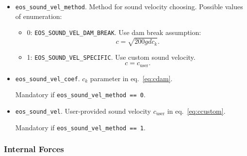 \begin{itemize}
    \item \verb|eos_sound_vel_method|. Method for sound velocity choosing. Possible values of enumeration:

    \begin{itemize}
        \item 0: \verb|EOS_SOUND_VEL_DAM_BREAK|. Use dam break assumption:
        \begin{equation}\label{eq:cdam}
            c = \sqrt{200gdc_{k}}.
        \end{equation}

        \item 1: \verb|EOS_SOUND_VEL_SPECIFIC|. Use custom sound velocity.
        \begin{equation}\label{eq:ccustom}
            c = c_{\text{user}}.
        \end{equation}
    \end{itemize}

    \item  \verb|eos_sound_vel_coef|. $c_{k}$ parameter in eq.~\ref{eq:cdam}.

    Mandatory if \verb|eos_sound_vel_method == 0|.
    
    \item \verb|eos_sound_vel|. User-provided sound velocity $c_{\text{user}}$ in eq.~\ref{eq:ccustom}.
    
    Mandatory if \verb|eos_sound_vel_method == 1|.
\end{itemize}

\subsubsection{Internal Forces}

